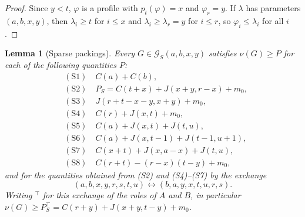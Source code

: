 \documentclass{amsart}
\newtheorem{lemma}[theorem]{Lemma}
\theoremstyle{definition}
\numberwithin{equation}{section}
\numberwithin{table}{section}
\begin{document}
\begin{proof}
Since $y<t$, $\varphi$ is a profile with $p_t(\varphi)=x$ and $\varphi_r=y$. If $\lambda$ has parameters $(a,b,x,y)$, then $\lambda_i\ge t$ for $i\le x$ and $\lambda_i\ge\lambda_r=y$ for $i\le r$, so $\varphi_i\le\lambda_i$ for all $i$.
\end{proof}

\begin{lemma}[Sparse packings]\label{lem:sparse-packings}
Every $G\in\mathcal G_S(a,b,x,y)$ satisfies $\nu(G)\ge P$ for each of the following quantities $P$:
\begin{align*}
&(\mathrm{S}1)\quad C(a)+C(b),\\
&(\mathrm{S}2)\quad P_S=C(t+x)+J(x+y,r-x)+m_0,\\
&(\mathrm{S}3)\quad J(r+t-x-y,x+y)+m_0,\\
&(\mathrm{S}4)\quad C(r)+J(x,t)+m_0,\\
&(\mathrm{S}5)\quad C(a)+J(x,t)+J(t,u),\\
&(\mathrm{S}6)\quad C(a)+J(x,t-1)+J(t-1,u+1),\\
&(\mathrm{S}7)\quad C(x+t)+J(x,a-x)+J(t,u),\\
&(\mathrm{S}8)\quad C(r+t)-(r-x)(t-y)+m_0,
\end{align*}
and for the quantities obtained from (S2) and (S4)--(S7) by the exchange
\[
(a,b,x,y,r,s,t,u)\leftrightarrow(b,a,y,x,t,u,r,s).
\]
Writing ${}^{\top}$ for this exchange of the roles of $A$ and $B$, in particular $\nu(G)\ge P_S^{\top}=C(r+y)+J(x+y,t-y)+m_0$.
\end{lemma}
\end{document}
